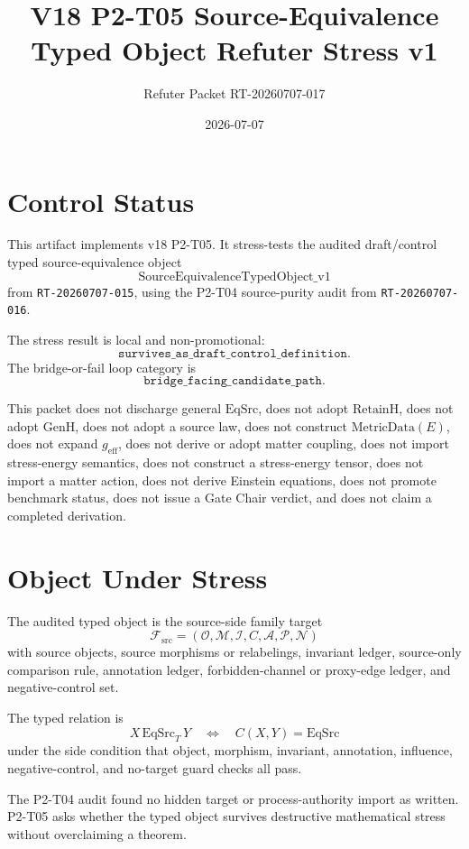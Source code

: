 \documentclass[11pt]{article}
\title{V18 P2-T05 Source-Equivalence Typed Object Refuter Stress v1}
\author{Refuter Packet RT-20260707-017}
\date{2026-07-07}
\newcommand{\EqSrc}{\mathrm{EqSrc}}
\newcommand{\EqSrcT}{\mathrm{EqSrc}_{T}}
\newcommand{\RetainH}{\mathrm{RetainH}}
\newcommand{\GenH}{\mathrm{GenH}}
\newcommand{\Fsrc}{\mathcal{F}_{\mathrm{src}}}
\newcommand{\Osrc}{\mathcal{O}}
\newcommand{\Msrc}{\mathcal{M}}
\newcommand{\Isrc}{\mathcal{I}}
\newcommand{\Asrc}{\mathcal{A}}
\newcommand{\Psrc}{\mathcal{P}}
\newcommand{\Nsrc}{\mathcal{N}}
\newcommand{\Csrc}{C}
\begin{document}
\maketitle

\section{Control Status}

This artifact implements v18 P2-T05. It stress-tests the audited
draft/control typed source-equivalence object
\[
  \mathrm{SourceEquivalenceTypedObject\_v1}
\]
from \texttt{RT-20260707-015}, using the P2-T04 source-purity audit from
\texttt{RT-20260707-016}.

The stress result is local and non-promotional:
\[
  \texttt{survives\_as\_draft\_control\_definition}.
\]
The bridge-or-fail loop category is
\[
  \texttt{bridge\_facing\_candidate\_path}.
\]

This packet does not discharge general \(\EqSrc\), does not adopt
\(\RetainH\), does not adopt \(\GenH\), does not adopt a source law, does not
construct \(\mathrm{MetricData}(E)\), does not expand \(g_{\mathrm{eff}}\),
does not derive or adopt matter coupling, does not import stress-energy
semantics, does not construct a stress-energy tensor, does not import a matter
action, does not derive Einstein equations, does not promote benchmark status,
does not issue a Gate Chair verdict, and does not claim a completed
derivation.

\section{Object Under Stress}

The audited typed object is the source-side family target
\[
  \Fsrc=(\Osrc,\Msrc,\Isrc,\Csrc,\Asrc,\Psrc,\Nsrc)
\]
with source objects, source morphisms or relabelings, invariant ledger,
source-only comparison rule, annotation ledger, forbidden-channel or proxy-edge
ledger, and negative-control set.

The typed relation is
\[
  X\,\EqSrcT\,Y \quad\Longleftrightarrow\quad \Csrc(X,Y)=\EqSrc
\]
under the side condition that object, morphism, invariant, annotation,
influence, negative-control, and no-target guard checks all pass.

The P2-T04 audit found no hidden target or process-authority import as written.
P2-T05 asks whether the typed object survives destructive mathematical stress
without overclaiming a theorem.
\end{document}
